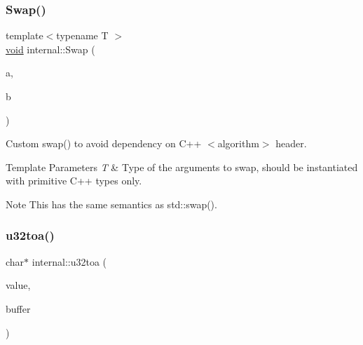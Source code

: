 \mbox{\label{namespaceinternal_a72b2c71d36273b9691487f58c671ce04}} 
\subsubsection{\texorpdfstring{Swap()}{Swap()}}
{\footnotesize\ttfamily template$<$typename T $>$ \\
\hyperlink{imgui__impl__opengl3__loader_8h_ac668e7cffd9e2e9cfee428b9b2f34fa7}{void} internal\+::\+Swap (\begin{DoxyParamCaption}\item[{T \&}]{a,  }\item[{T \&}]{b }\end{DoxyParamCaption})\hspace{0.3cm}{\ttfamily [inline]}}



Custom swap() to avoid dependency on C++ $<$algorithm$>$ header. 


\begin{DoxyTemplParams}{Template Parameters}
{\em T} & Type of the arguments to swap, should be instantiated with primitive C++ types only. \\
\hline
\end{DoxyTemplParams}
\begin{DoxyNote}{Note}
This has the same semantics as std\+::swap(). 
\end{DoxyNote}
\mbox{\label{namespaceinternal_a8628d3698be60950743bc49d41a1cca7}} 
\subsubsection{\texorpdfstring{u32toa()}{u32toa()}}
{\footnotesize\ttfamily char$\ast$ internal\+::u32toa (\begin{DoxyParamCaption}\item[{\hyperlink{stdint_8h_a435d1572bf3f880d55459d9805097f62}{uint32\+\_\+t}}]{value,  }\item[{char $\ast$}]{buffer }\end{DoxyParamCaption})\hspace{0.3cm}{\ttfamily [inline]}}

\mbox{\label{namespaceinternal_aff16deebb94b3ea88a1dfff7bbc377b0}} 

